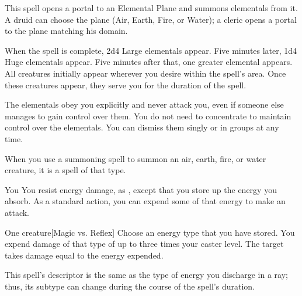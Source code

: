 \begin{spellheader}
    \spelldur{\durlong \dismissable}
\end{spellheader}
\begin{spelleffects}
    \spellline
    \spelleffect This spell opens a portal to an Elemental Plane and summons elementals from it. A druid can choose the plane (Air, Earth, Fire, or Water); a cleric opens a portal to the plane matching his domain.
    \par When the spell is complete, 2d4 Large elementals appear. Five minutes later, 1d4 Huge elementals appear. Five minutes after that, one greater elemental appears. All creatures initially appear wherever you desire within the spell's area. Once these creatures appear, they serve you for the duration of the spell.
    \par The elementals obey you explicitly and never attack you, even if someone else manages to gain control over them. You do not need to concentrate to maintain control over the elementals. You can dismiss them singly or in groups at any time.
\end{spelleffects}
\begin{spellfooter}
    \spellnotes When you use a summoning spell to summon an air, earth, fire, or water creature, it is a spell of that type.
\end{spellfooter}

\begin{spellheader}
\end{spellheader}
\begin{spelleffects}
    \begin{spelltarget}{You}
        \spelleffect You resist energy damage, as , except that you store up the energy you absorb. As a standard action, you can expend some of that energy to make an attack.
    \end{spelltarget}
    \spellrng{\rngclose}
    \begin{spelltarget}{One creature}[Magic vs. Reflex]
        \spelleffect Choose an energy type that you have stored. You expend damage of that type of up to three times your caster level.
        \spellsuccess The target takes damage equal to the energy expended.
    \end{spelltarget}
\end{spelleffects}
\begin{spellfooter}
    \spellnotes This spell's descriptor is the same as the type of energy you discharge in a ray; thus, its subtype can change during the course of the spell's duration.
\end{spellfooter}

